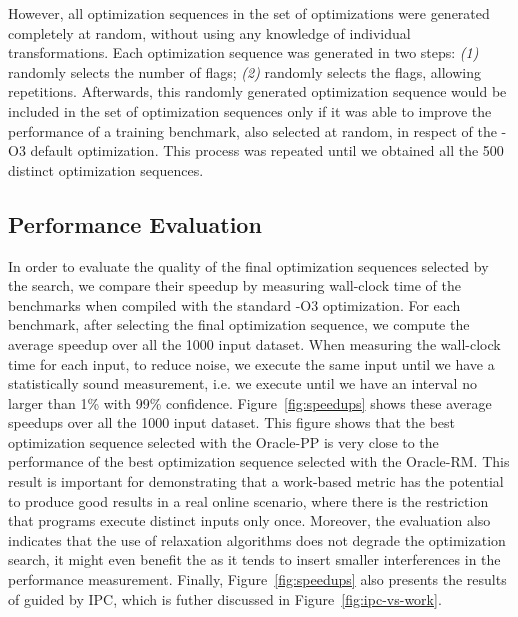 However, all optimization sequences in the set of optimizations were generated completely at random, without using any knowledge of individual transformations.
Each optimization sequence was generated in two steps: \textit{(1)} randomly selects the number of flags; \textit{(2)} randomly selects the flags, allowing repetitions.
Afterwards, this randomly generated optimization sequence would be included in the set of optimization sequences only if it was able to improve the performance of a training benchmark, also selected at random, in respect of the {\flagstype -O3} default optimization.
This process was repeated until we obtained all the 500 distinct optimization sequences.

\subsection{Performance Evaluation}

In order to evaluate the quality of the final optimization sequences selected by the {\itercomp} search, we compare their speedup by measuring wall-clock time of the benchmarks when compiled with the standard {\flagstype -O3} optimization.
For each benchmark, after selecting the final optimization sequence, we compute the average speedup over all the 1000 input dataset.
When measuring the wall-clock time for each input, to reduce noise, we execute the same input until we have a statistically sound measurement, i.e. we execute until we have an interval no larger than 1\% with 99\% confidence.
Figure~\ref{fig:speedups} shows these average speedups over all the 1000 input dataset.
This figure shows that the best optimization sequence selected with the Oracle-PP is very close to the performance of the best optimization sequence selected with the Oracle-RM.
This result is important for demonstrating that a work-based metric has the potential to produce good results in a real online scenario, where there is the restriction that programs execute distinct inputs only once.
Moreover, the evaluation also indicates that the use of relaxation algorithms does not degrade the optimization search,
it might even benefit the {\itercomp} as it tends to insert smaller interferences in the performance measurement.
Finally, Figure~\ref{fig:speedups} also presents the results of {\itercomp} guided by IPC, which is futher discussed in Figure~\ref{fig:ipc-vs-work}.

